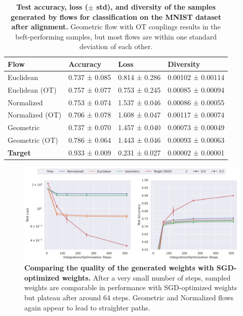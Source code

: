 \begin{table}[t!]
    \centering
    \begin{tabular}{llll}
        \toprule
        \textbf{Flow}  & \textbf{Accuracy} & \textbf{Loss} & \textbf{Diversity} \\
        \midrule 
        Euclidean               & 0.737 ± 0.085	& 0.814 ± 0.286 & 0.00102 ± 0.00114 \\
        Euclidean (OT)          & 0.757 ± 0.077 & 0.753 ± 0.245 & 0.00085 ± 0.00094 \\
        \midrule
        Normalized              & 0.753 ± 0.074	& 1.537 ± 0.046 & 0.00086 ± 0.00055 \\
        Normalized (OT)         & 0.706 ± 0.078 & 1.608 ± 0.047 & 0.00117 ± 0.00074 \\
        \midrule
        Geometric               & 0.737 ± 0.070	& 1.457 ± 0.040 & 0.00073 ± 0.00049 \\
        Geometric (OT)          & 0.786 ± 0.064 & 1.443 ± 0.046 & 0.00093 ± 0.00063 \\
        \midrule
        \textbf{Target}         & 0.933 ± 0.009 & 0.231 ± 0.027 & 0.00002 ± 0.00001  \\
        \bottomrule
    \end{tabular}
    \caption{\label{tab:mnist_class_table}\textbf{Test accuracy, loss ($\pm$ std), and diversity of the samples generated by flows for classification on the MNIST dataset after alignment.} Geometric flow with OT couplings results in the beft-performing samples, but most flows are within one standard deviation of each other. }
\end{table}

\begin{figure}[t!]
    \centering
    \includegraphics[width=\linewidth]{figures/mnist/mnist_steps_both.png}
    \caption{\label{fig:mnist_steps}\textbf{Comparing the quality of the generated weights with SGD-optimized weights.} After a very small number of steps, sampled weights are comparable in performance with SGD-optimized weights but plateau after around 64 steps. Geometric and Normalized flows again appear to lead to straighter paths.} 
\end{figure}


